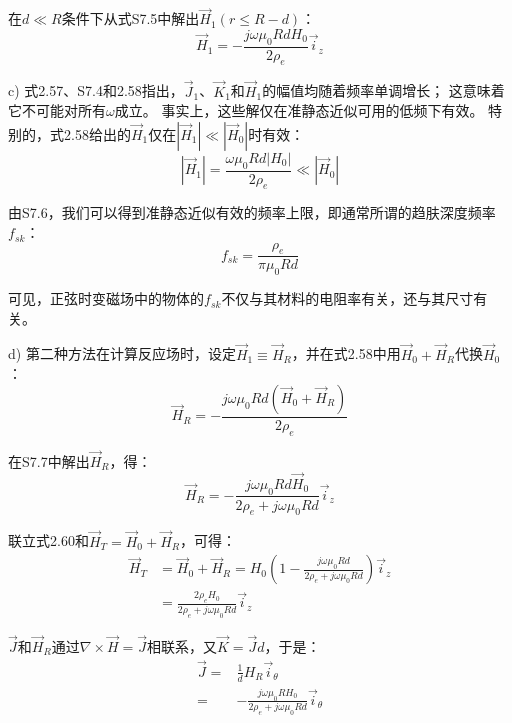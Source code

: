 在$d\ll R$条件下从式S7.5中解出$\vec{H}_1(r\le R-d)$：
\begin{equation*}
\vec{H}_1=-\frac{j\omega \mu_0 R d H_0}{2\rho_e}\vec{i}_z \tag{2.58}
\end{equation*}

c) 式2.57、S7.4和2.58指出，$\vec{J}_1$、$\vec{K}_1$和$\vec{H}_1$的幅值均随着频率单调增长；
这意味着它不可能对所有$\omega$成立。
事实上，这些解仅在准静态近似可用的低频下有效。
特别的，式2.58给出的$\vec{H}_1$仅在$|\vec{H}_1|\ll |\vec{H}_0|$时有效：
\begin{equation*}
|\vec{H}_1|=\frac{\omega \mu_0 R d |H_0|}{2\rho_e}\ll |\vec{H}_0|\tag{S7.6}
\end{equation*}

由S7.6，我们可以得到准静态近似有效的频率上限，即通常所谓的趋肤深度频率$f_{sk}$：
\begin{equation*}
f_{sk}=\frac{\rho_e}{\pi \mu_0 R d} \tag{2.59}
\end{equation*}

可见，正弦时变磁场中的物体的$f_{sk}$不仅与其材料的电阻率有关，还与其尺寸有关。

d) 第二种方法在计算反应场时，设定$\vec{H}_1\equiv \vec{H}_R$，并在式2.58中用$\vec{H}_0+\vec{H}_R$代换$\vec{H}_0$：
\begin{equation*}
\vec{H}_R=-\frac{j\omega \mu_0 R d (\vec{H}_0+\vec{H}_R)}{2\rho_e} \tag{S7.7}
\end{equation*}

在S7.7中解出$\vec{H}_R$，得：
\begin{equation*}
\vec{H}_R=-\frac{j\omega \mu_0 R d \vec{H}_0}{2\rho_e+j\omega \mu_0 R d}\vec{i}_z \tag{2.60}
\end{equation*}

联立式2.60和$\vec{H}_T=\vec{H}_0+\vec{H}_R$，可得：
\begin{align}
\vec{H}_T&=\vec{H}_0+\vec{H}_R=H_0\left(1-\frac{j\omega\mu_0 R d}{2\rho_e+j\omega\mu_0 Rd}\right)\vec{i}_z\nonumber\\
&=\frac{2\rho_e H_0}{2\rho_e+j\omega \mu_0 R d}\vec{i}_z\nonumber\tag{2.61}
\end{align}

$\vec{J}$和$\vec{H}_R$通过$\nabla\times \vec{H}=\vec{J}$相联系，又$\vec{K}=\vec{J}d$，于是：
\begin{align}
\vec{J}=&\frac{1}{d}H_R \vec{i}_\theta \nonumber\tag{S7.8}\\
=&-\frac{j\omega \mu_0 R H_0}{2\rho_e+j\omega \mu_0 R d}\vec{i}_\theta\nonumber\tag{2.62}
\end{align}

